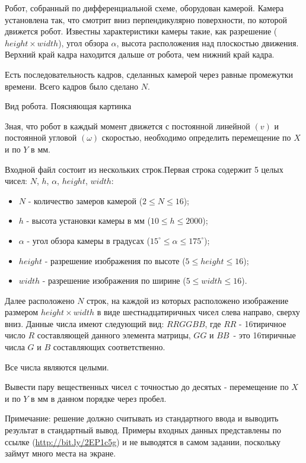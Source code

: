 
Робот, собранный по дифференциальной схеме, оборудован камерой. Камера установлена так, что смотрит 
вниз перпендикулярно поверхности, по которой движется робот. Известны характеристики камеры такие, 
как разрешение ($height \times width$), угол обзора $\alpha$, высота расположения над плоскостью движения. 
Верхний край кадра находится дальше от робота, чем нижний край кадра.

Есть последовательность кадров, сделанных камерой через равные промежутки времени. Всего кадров было сделано $N$.


Вид робота. Поясняющая картинка

Зная, что робот в каждый момент движется с постоянной линейной $(v)$ и постоянной угловой $(\omega)$ скоростью, необходимо определить перемещение по $ X $ и по $Y$ в мм.


Входной файл состоит из нескольких строк.Первая строка содержит 5 целых чисел: $N$, $h$, $\alpha$, $height$, $width$:

\begin{itemize}
    \item $N$ - количество замеров камерой ($2 \leq N \leq 16$);
    \item $h$ - высота установки камеры в мм ($10 \leq h \leq 2000$);
    \item $\alpha$ - угол обзора камеры в градусах ($15^\circ \leq \alpha \leq 175^\circ$);
    \item $height$ - разрешение изображения по высоте ($5 \leq height \leq 16$);
    \item $width$ - разрешение изображения по ширине ($5 \leq width \leq 16$).
\end{itemize}

Далее расположено $N$ строк, на каждой из которых расположено изображение размером $height\times width$ 
в виде шестнадцатиричных чисел слева направо, сверху вниз. Данные числа имеют следующий вид: $RRGGBB$, 
где $RR$ - 16тиричное число $R$ составляющей данного элемента матрицы, $GG$  и $BB$ - это 16тиричные числа $G$ и $B$ составляющих 
соответственно.

Все числа являются целыми.

\outputfmtSection

Вывести пару вещественных чисел с точностью до десятых - перемещение по $X$ и по $Y$ в мм в данном порядке через пробел.

Примечание: решение должно считывать из стандартного ввода и выводить результат в стандартный вывод. 
Примеры входных данных представлены по ссылке (\url{http://bit.ly/2EP1c5g}) и не выводятся в самом задании, поскольку займут много места на экране.

